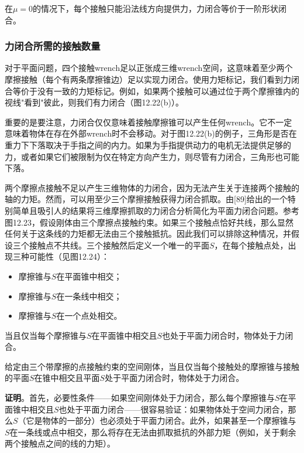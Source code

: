 \documentclass[12pt,a4paper]{article}
\begin{document}
在$\mu = 0$的情况下，每个接触只能沿法线方向提供力，力闭合等价于一阶形状闭合。

\subsubsection{力闭合所需的接触数量}
\label{subsubsec:number_of_contacts_force_closure}

对于平面问题，四个接触wrench足以正张成三维wrench空间，这意味着至少两个摩擦接触（每个有两条摩擦锥边）足以实现力闭合。使用力矩标记，我们看到力闭合等价于没有一致的力矩标记。例如，如果两个接触可以通过位于两个摩擦锥内的视线"看到"彼此，则我们有力闭合（图12.22(b)）。

重要的是要注意，力闭合仅仅意味着接触摩擦锥可以产生任何wrench。它不一定意味着物体在存在外部wrench时不会移动。对于图12.22(b)的例子，三角形是否在重力下下落取决于手指之间的内力。如果为手指提供动力的电机无法提供足够的力，或者如果它们被限制为仅在特定方向产生力，则尽管有力闭合，三角形也可能下落。

两个摩擦点接触不足以产生三维物体的力闭合，因为无法产生关于连接两个接触的轴的力矩。然而，可以用至少三个摩擦接触获得力闭合抓取。由[89]给出的一个特别简单且吸引人的结果将三维摩擦抓取的力闭合分析简化为平面力闭合问题。参考图12.23，假设刚体由三个摩擦点接触约束。如果三个接触点恰好共线，那么显然任何关于这条线的力矩都无法由三个接触抵抗。因此我们可以排除这种情况，并假设三个接触点不共线。三个接触然后定义一个唯一的平面$S$，在每个接触点处，出现三种可能性（见图12.24）：
\begin{itemize}
\item 摩擦锥与$S$在平面锥中相交；
\item 摩擦锥与$S$在一条线中相交；
\item 摩擦锥与$S$在一个点处相交。
\end{itemize}

当且仅当每个摩擦锥与$S$在平面锥中相交且$S$也处于平面力闭合时，物体处于力闭合。

\begin{theorem}[12.8]
给定由三个带摩擦的点接触约束的空间刚体，当且仅当每个接触处的摩擦锥与接触的平面$S$在锥中相交且平面$S$处于平面力闭合时，物体处于力闭合。
\end{theorem}

\textbf{证明}。首先，必要性条件——如果空间刚体处于力闭合，那么每个摩擦锥与$S$在平面锥中相交且$S$也处于平面力闭合——很容易验证：如果物体处于空间力闭合，那么$S$（它是物体的一部分）也必须处于平面力闭合。此外，如果甚至一个摩擦锥与$S$在一条线或点中相交，那么将存在无法由抓取抵抗的外部力矩（例如，关于剩余两个接触点之间的线的力矩）。
\end{document}
